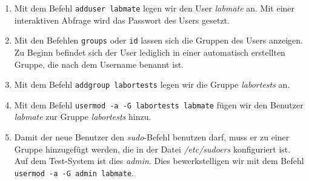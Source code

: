 \documentclass{scrartcl}
\begin{document}
    \begin{enumerate}[1.]
        \item Mit dem Befehl \texttt{adduser labmate} legen wir den User
              \textit{labmate} an. Mit einer interaktiven Abfrage wird das
              Passwort des Users gesetzt.
        \item Mit den Befehlen \texttt{groups} oder \texttt{id} lassen sich die
              Gruppen des Users anzeigen. Zu Beginn befindet sich der User
              lediglich in einer automatisch erstellten Gruppe, die nach dem
              Username benannt ist.
        \item Mit dem Befehl \texttt{addgroup labortests} legen wir die Gruppe
              \textit{labortests} an.
        \item Mit dem Befehl \texttt{usermod -a -G labortests labmate} fügen wir
              den Benutzer \textit{labmate} zur Gruppe \textit{labortests} hinzu.
        \item Damit der neue Benutzer den \textit{sudo}-Befehl benutzen darf,
              muss er zu einer Gruppe hinzugefügt werden, die in der Datei
              \textit{/etc/sudoers} konfiguriert ist. Auf dem Test-System ist
              dies \textit{admin}. Dies bewerkstelligen wir mit dem Befehl
              \texttt{usermod -a -G admin labmate}.
    \end{enumerate}
\end{document}
